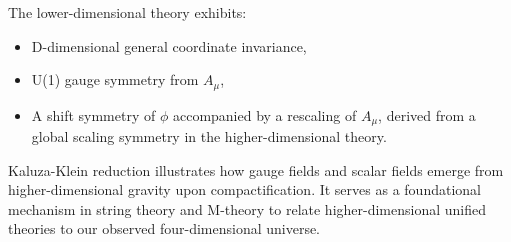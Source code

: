 The lower-dimensional theory exhibits:
\begin{itemize}
  \item D-dimensional general coordinate invariance,
  \item U(1) gauge symmetry from \( A_\mu \),
  \item A shift symmetry of \( \phi \) accompanied by a rescaling of \( A_\mu \), derived from a global scaling symmetry in the higher-dimensional theory.
\end{itemize}

Kaluza-Klein reduction illustrates how gauge fields and scalar fields emerge from higher-dimensional gravity upon compactification. It serves as a foundational mechanism in string theory and M-theory to relate higher-dimensional unified theories to our observed four-dimensional universe.


